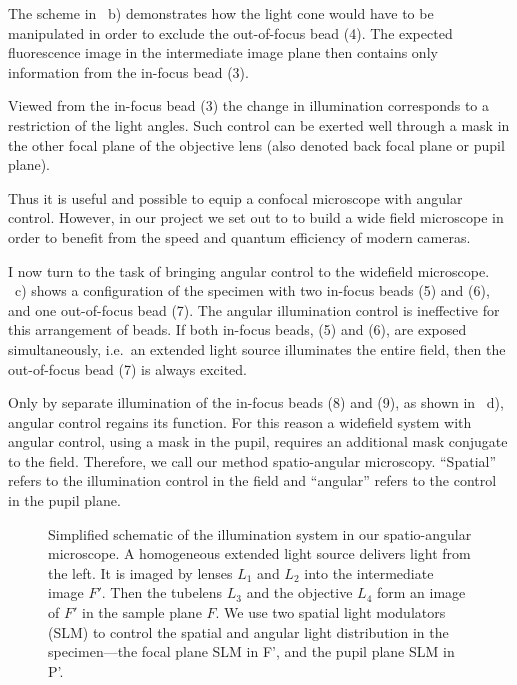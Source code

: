 The scheme in ~b) demonstrates how the light
cone would have to be manipulated in order to exclude the out-of-focus
bead (4). The expected fluorescence image in the intermediate image
plane then contains only information from the in-focus bead (3).

Viewed from the in-focus bead (3) the change in illumination
corresponds to a restriction of the light angles. Such control can be
exerted well through a mask in the other focal plane of the objective
lens (also denoted back focal plane or pupil plane).

Thus it is useful and possible to equip a confocal microscope with
angular control. However, in our project we set out to to build a wide
field microscope in order to benefit from the speed and quantum
efficiency of modern cameras.

I now turn to the task of bringing angular control to the widefield
microscope. ~c) shows a configuration of the
specimen with two in-focus beads (5) and (6), and one out-of-focus
bead (7).  The angular illumination control is ineffective for this
arrangement of beads.  If both in-focus beads, (5) and (6), are
exposed simultaneously, i.e.\ an extended light source illuminates the
entire field, then the out-of-focus bead (7) is always excited.

Only by separate illumination of the in-focus beads (8) and (9), as
shown in ~d), angular control regains its
function. For this reason a widefield system with angular control,
using a mask in the pupil, requires an additional mask conjugate to
the field.  Therefore, we call our method spatio-angular
microscopy. ``Spatial'' refers to the illumination control in the
field and ``angular'' refers to the control in the pupil plane.


\begin{figure}[!hbt] \centering {}
  \caption{Simplified schematic of the illumination system in our
spatio-angular microscope. A homogeneous extended light source
delivers light from the left. It is imaged by lenses $L_1$ and $L_2$
into the intermediate image $F'$. Then the tubelens $L_3$ and the
objective $L_4$ form an image of $F'$ in the sample plane $F$. We use
two spatial light modulators (SLM) to control the spatial and angular
light distribution in the specimen---the focal plane SLM in F', and
the pupil plane SLM in P'.}
  \label{fig:memi-simple}
\end{figure}

